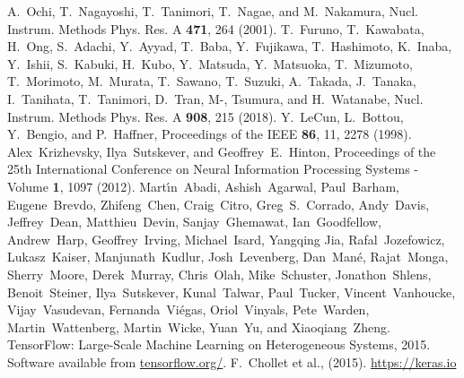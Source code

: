 \documentclass{jps-cp}
\begin{document}
\begin{thebibliography}{9}
  A.~Ochi, T.~Nagayoshi, T.~Tanimori, T.~Nagae, and M.~Nakamura,
  Nucl. Instrum. Methods Phys. Res. A \textbf{471}, 264 (2001).
  T.~Furuno, T.~Kawabata, H.~Ong, S.~Adachi, Y.~Ayyad, T.~Baba, Y.~Fujikawa, T.~Hashimoto, K.~Inaba, Y.~Ishii,
  S.~Kabuki, H.~Kubo, Y.~Matsuda, Y.~Matsuoka, T.~Mizumoto, T.~Morimoto, M.~Murata, T.~Sawano, T.~Suzuki, A.~Takada,
  J.~Tanaka, I.~Tanihata, T.~Tanimori, D.~Tran, M-, Tsumura, and H.~Watanabe,
  Nucl. Instrum. Methods Phys. Res. A \textbf{908}, 215 (2018).
  Y.~LeCun, L.~Bottou, Y.~Bengio, and P.~Haffner,
  Proceedings of the IEEE \textbf{86}, 11, 2278 (1998).
  Alex~Krizhevsky, Ilya~Sutskever, and Geoffrey~E.~Hinton,
  Proceedings of the 25th International Conference on Neural Information Processing Systems - Volume \textbf{1}, 1097 (2012).
  Mart\'{\i}n~Abadi,
  Ashish~Agarwal,
  Paul~Barham,
  Eugene~Brevdo,
  Zhifeng~Chen,
  Craig~Citro,
  Greg~S.~Corrado,
  Andy~Davis,
  Jeffrey~Dean,
  Matthieu~Devin,
  Sanjay~Ghemawat,
  Ian~Goodfellow,
  Andrew~Harp,
  Geoffrey~Irving,
  Michael~Isard,
  Yangqing Jia,
  Rafal~Jozefowicz,
  Lukasz~Kaiser,
  Manjunath~Kudlur,
  Josh~Levenberg,
  Dan~Man\'{e},
  Rajat~Monga,
  Sherry~Moore,
  Derek~Murray,
  Chris~Olah,
  Mike~Schuster,
  Jonathon~Shlens,
  Benoit~Steiner,
  Ilya~Sutskever,
  Kunal~Talwar,
  Paul~Tucker,
  Vincent~Vanhoucke,
  Vijay~Vasudevan,
  Fernanda~Vi\'{e}gas,
  Oriol~Vinyals,
  Pete~Warden,
  Martin~Wattenberg,
  Martin~Wicke,
  Yuan~Yu, and
  Xiaoqiang~Zheng.
  {{TensorFlow}: Large-Scale Machine Learning on Heterogeneous Systems},
  2015.
  Software available from \url{tensorflow.org/}.
  F.~Chollet et al., (2015). \url{https://keras.io}
%
  
\end{thebibliography}
\end{document}

